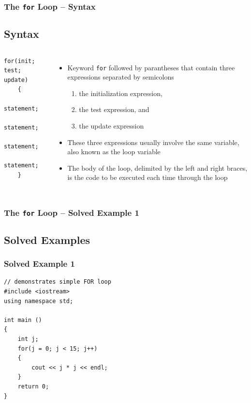 \documentclass{beamer}
\begin{document}
\begin{frame}[fragile]
    \frametitle{The \texttt{for} Loop -- Syntax}
    \subsection{Syntax} %
    \label{sub:for_syntax}
    \begin{columns}
        \lstset{style=mystyle}
\begin{lstlisting}
for(init; test; update)
    {
       statement;
       statement;
       statement;
       statement;
    }
\end{lstlisting}
            \begin{itemize}
            \item Keyword \texttt{for} followed by parantheses that contain three expressions separated by semicolons
            \begin{enumerate}
                \item the initialization expression,
                \item the test expression, and
                \item the update expression
            \end{enumerate}
            \item These three expressions usually involve the same variable, also known as the loop variable
            \item The body of the loop, delimited by the left and right braces, is the code to be executed each time through the loop
            \end{itemize}
    \end{columns}
\end{frame}

\begin{frame} [fragile]
    \frametitle{The \texttt{for} Loop -- Solved Example 1}
    \subsection{Solved Examples} %
    \label{sub:for_solved_examples}
    \subsubsection{Solved Example 1} %
    \label{subsub:solved_example_1}
    \lstset{style=mystyle}
    \begin{lstlisting}
// demonstrates simple FOR loop
#include <iostream>
using namespace std;

int main ()
{
    int j;
    for(j = 0; j < 15; j++)
    {
        cout << j * j << endl;
    }
    return 0;
}
\end{lstlisting}
\end{frame}
\end{document}
